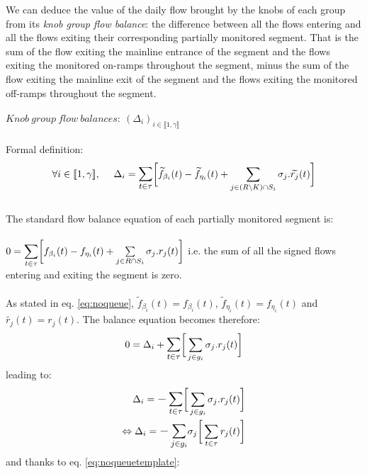 We can deduce the value of the daily flow brought by the knobs of each group from its \emph{knob group flow balance}: the difference between all the flows entering and all the flows exiting their corresponding partially monitored segment. That is the sum of the flow exiting the mainline entrance of the segment and the flows exiting the monitored on-ramps throughout the segment, minus the sum of the flow exiting the mainline exit of the segment and the flows exiting the monitored off-ramps throughout the segment.\\ 
\\
$Knob\ group\ flow\ balances:\ (\Delta_{i})_{i\in \llbracket 1,\gamma \rrbracket} $\\
\\
Formal definition:\\
\begin{equation*}
\forall i \in \llbracket 1,\gamma \rrbracket, \ \ \ \ \Delta_{i} =\mathlarger{\sum\limits_{t\in \tau}}\bigg[\widetilde{f}_{\beta_{i}}(t)-\widetilde{f}_{\eta_{i}}(t)+\sum\limits_{j\in (R\backslash K)\cap S_{i}}\sigma_{j}.\widetilde{r_{j}}(t)\bigg]
\end{equation*}
\\
The standard flow balance equation of each partially monitored segment is:\\
\\
$0=\mathlarger{\sum\limits_{t\in \tau}}\bigg[f_{\beta_{i}}(t)-f_{\eta_{i}}(t)+\sum\limits_{j\in R\cap S_{i}}\sigma_{j}.r_{j}(t)\bigg]$   i.e. the sum of all the signed flows entering and exiting the segment is zero.\\
\\
As stated in eq. \ref{eq:noqueue}, $\widetilde{f}_{\beta_{i}}(t)=f_{\beta_{i}}(t)$, $\widetilde{f}_{\eta_{i}}(t)=f_{\eta_{i}}(t)$ and $\widetilde{r_{j}}(t)=r_{j}(t)$. The balance equation becomes therefore:\\
\begin{equation*}
0=\Delta_{i}+\mathlarger{\sum\limits_{t\in \tau}}\bigg[\sum\limits_{j\in g_{i}}\sigma_{j}.r_{j}(t)\bigg]
\end{equation*}
leading to:
\begin{align*}
\Delta_{i}=\mathlarger{-\sum\limits_{t\in \tau}}\bigg[\sum\limits_{j\in g_{i}}\sigma_{j}.r_{j}(t)\bigg]\\
\Leftrightarrow \Delta_{i}=\mathlarger{-\sum\limits_{j\in g_{i}}}\sigma_{j}\bigg[\sum\limits_{t\in \tau}r_{j}(t)\bigg]\\
\end{align*}
and thanks to eq. \ref{eq:noqueuetemplate}:
